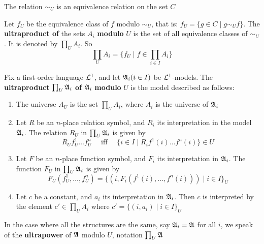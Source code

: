\documentclass[11pt]{article}
\begin{document}
\begin{proposition}[]
The relation \(\sim_U\) is an equivalence relation on the set \(C\)
\end{proposition}

\begin{definition}[]
Let \(f_U\) be the equivalence class of \(f\) modulo \(\sim_U\), that is:
\(f_U=\{g\in C\mid g\sim_U f\}\). The \textbf{ultraproduct of} the sets \(A_i\)
\textbf{modulo} \(U\) is the set of all equivalence classes of \(\sim_U\). It is
denoted by \(\prod_UA_i\). So
\begin{equation*}
\prod_UA_i=\{f_U\mid f\in\prod_{i\in I}A_i\}
\end{equation*}
\end{definition}

\begin{definition}[]
Fix a first-order language \(\mathcal{L}^1\), and let \(\mathfrak{A}_i(i\in I)\) be
\(\mathcal{L}^1\)-models. The \textbf{ultraproduct} \(\prod_U\mathfrak{A}_i\) \textbf{of} \(\mathfrak{A}_i\) \textbf{modulo}
\(U\) is the model described as follows:
\begin{enumerate}
\item The universe \(A_U\) is the set \(\prod_UA_i\), where \(A_i\) is the
universe of \(\mathfrak{A}_i\)
\item Let \(R\) be an \(n\)-place relation symbol, and \(R_i\) its
interpretation in the model \(\mathfrak{A}_i\). The relation \(R_U\) in
\(\prod_U\mathfrak{A}_i\) is given by
\begin{equation*}
R_Uf_U^1\dots f_U^n \quad\text{ iff }\quad
\{i\in I\mid R_if^1(i)\dots f^n(i)\}\in U
\end{equation*}
\item Let \(F\) be an \(n\)-place function symbol, and \(F_i\) its
interpretation in \(\mathfrak{A}_i\). The function \(F_U\) in \(\prod_U\mathfrak{A}_i\) is
given by
\begin{equation*}
F_U(f_U^1,\dots,f_U^n)=
\{(i,F_i(f^1(i),\dots,f^n(i)))\mid i\in I\}_U
\end{equation*}
\item Let \(c\) be a constant, and \(a_i\) its interpretation in \(\mathfrak{A}_i\).
Then \(c\) is interpreted by the element \(c'\in\prod_UA_i\) where
\(c'=\{(i,a_i)\mid i\in I\}_U\)
\end{enumerate}


In the case where all the structures are the same, say \(\mathfrak{A}_i=\mathfrak{A}\) for all
\(i\), we speak of the \textbf{ultrapower} of \(\mathfrak{A}\)  modulo \(U\), notation \(\prod_U\mathfrak{A}\)
\end{definition}
\end{document}
